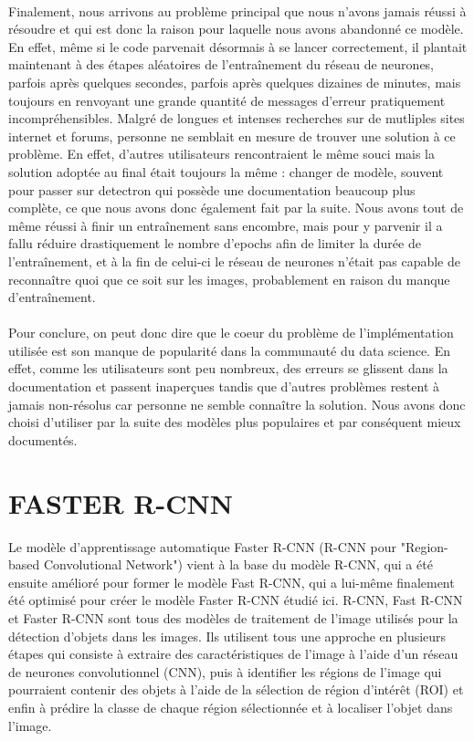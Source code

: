 \paragraph{} Finalement, nous arrivons au problème principal que nous n'avons jamais réussi à résoudre et qui est donc la raison pour laquelle nous avons abandonné ce modèle. En effet, même si le code parvenait désormais à se lancer correctement, il plantait maintenant à des étapes aléatoires de l'entraînement du réseau de neurones, parfois après quelques secondes, parfois après quelques dizaines de minutes, mais toujours en renvoyant une grande quantité de messages d'erreur pratiquement incompréhensibles. Malgré de longues et intenses recherches sur de mutliples sites internet et forums, personne ne semblait en mesure de trouver une solution à ce problème. En effet, d'autres utilisateurs rencontraient le même souci mais la solution adoptée au final était toujours la même : changer de modèle, souvent pour passer sur detectron qui possède une documentation beaucoup plus complète, ce que nous avons donc également fait par la suite. Nous avons tout de même réussi à finir un entraînement sans encombre, mais pour y parvenir il a fallu réduire drastiquement le nombre d'epochs afin de limiter la durée de l'entraînement, et à la fin de celui-ci le réseau de neurones n'était pas capable de reconnaître quoi que ce soit sur les images, probablement en raison du manque d'entraînement.

\paragraph{} Pour conclure, on peut donc dire que le coeur du problème de l'implémentation utilisée est son manque de popularité dans la communauté du data science. En effet, comme les utilisateurs sont peu nombreux, des erreurs se glissent dans la documentation et passent inaperçues tandis que d'autres problèmes restent à jamais non-résolus car personne ne semble connaître la solution. Nous avons donc choisi d'utiliser par la suite des modèles plus populaires et par conséquent mieux documentés. 


\section{FASTER R-CNN}

Le modèle d'apprentissage automatique Faster R-CNN (R-CNN pour "Region-based Convolutional Network") vient à la base du modèle R-CNN, qui a été ensuite amélioré pour former le modèle Fast R-CNN, qui a lui-même finalement été optimisé pour créer le modèle Faster R-CNN étudié ici. R-CNN, Fast R-CNN et Faster R-CNN sont tous des modèles de traitement de l'image utilisés pour la détection d'objets dans les images. Ils utilisent tous une approche en plusieurs étapes qui consiste à extraire des caractéristiques de l'image à l'aide d'un réseau de neurones convolutionnel (CNN), puis à identifier les régions de l'image qui pourraient contenir des objets à l'aide de la sélection de région d'intérêt (ROI) et enfin à prédire la classe de chaque région sélectionnée et à localiser l'objet dans l'image.

